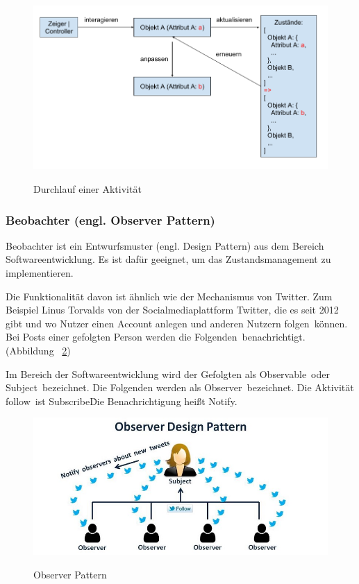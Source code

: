 \begin{figure}[ht]
\centering
\caption[Durchlauf einer Aktivität]{Durchlauf einer Aktivität}
\includegraphics[width=\textwidth]{images/interaktionVerlauf.png}
\label{fig:interaktionVerlauf} 
\end{figure}
 
  \subsubsection{Beobachter (engl. Observer Pattern)}
  Beobachter ist ein Entwurfsmuster (engl. Design Pattern) aus dem Bereich Softwareentwicklung. Es ist dafür geeignet, um das Zustandsmanagement zu implementieren.
  
  Die Funktionalität davon ist ähnlich wie der Mechanismus von Twitter. Zum Beispiel Linus Torvalds \citep{42} von der Socialmediaplattform Twitter, die es seit 2012 gibt und wo Nutzer einen Account anlegen und anderen Nutzern \glqq folgen\grqq\ können. Bei Posts einer gefolgten Person werden die \glqq Folgenden\grqq\ benachrichtigt. (Abbildung ~\ref{fig:observerPatern})
  
  Im Bereich der Softwareentwicklung wird der Gefolgten als \glqq Observable\grqq\ oder \glqq Subject\grqq\ bezeichnet. Die Folgenden werden als \glqq Observer\grqq\ bezeichnet. Die Aktivität \glqq follow\grqq\ ist \glqq Subscribe\grqq\. Die Benachrichtigung heißt \glqq Notify\grqq.
  
\begin{figure}[ht]
\centering
\caption[Observer Pattern]{Observer Pattern}
\includegraphics[width=\textwidth]{images/observerPattern.jpeg}
\label{fig:observerPatern} 
\end{figure}
  
